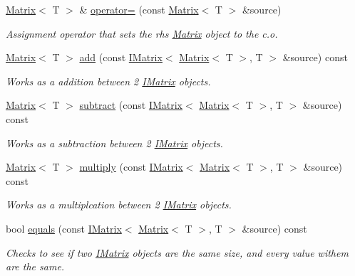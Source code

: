 \begin{DoxyCompactItemize}
\mbox{\hyperlink{class_matrix}{Matrix}}$<$ T $>$ \& \mbox{\hyperlink{class_matrix_a33c00fb6f2e9401d17d9ed615b965634}{operator=}} (const \mbox{\hyperlink{class_matrix}{Matrix}}$<$ T $>$ \&source)
\begin{DoxyCompactList}\small\item\em Assignment operator that sets the rhs \mbox{\hyperlink{class_matrix}{Matrix}} object to the c.\+o. \end{DoxyCompactList}\item 
\mbox{\hyperlink{class_matrix}{Matrix}}$<$ T $>$ \mbox{\hyperlink{class_matrix_a19ee57616bae9c683f2c9e6756cba29e}{add}} (const \mbox{\hyperlink{class_i_matrix}{I\+Matrix}}$<$ \mbox{\hyperlink{class_matrix}{Matrix}}$<$ T $>$, T $>$ \&source) const
\begin{DoxyCompactList}\small\item\em Works as a addition between 2 \mbox{\hyperlink{class_i_matrix}{I\+Matrix}} objects. \end{DoxyCompactList}\item 
\mbox{\hyperlink{class_matrix}{Matrix}}$<$ T $>$ \mbox{\hyperlink{class_matrix_a468aedc8546d97964f692a30f1e24f94}{subtract}} (const \mbox{\hyperlink{class_i_matrix}{I\+Matrix}}$<$ \mbox{\hyperlink{class_matrix}{Matrix}}$<$ T $>$, T $>$ \&source) const
\begin{DoxyCompactList}\small\item\em Works as a subtraction between 2 \mbox{\hyperlink{class_i_matrix}{I\+Matrix}} objects. \end{DoxyCompactList}\item 
\mbox{\hyperlink{class_matrix}{Matrix}}$<$ T $>$ \mbox{\hyperlink{class_matrix_a48fc463a410f5d2b0381830d78229c2c}{multiply}} (const \mbox{\hyperlink{class_i_matrix}{I\+Matrix}}$<$ \mbox{\hyperlink{class_matrix}{Matrix}}$<$ T $>$, T $>$ \&source) const
\begin{DoxyCompactList}\small\item\em Works as a multiplcation between 2 \mbox{\hyperlink{class_i_matrix}{I\+Matrix}} objects. \end{DoxyCompactList}\item 
bool \mbox{\hyperlink{class_matrix_a7bdfaca00fd65171656fd45bdaa6b2a0}{equals}} (const \mbox{\hyperlink{class_i_matrix}{I\+Matrix}}$<$ \mbox{\hyperlink{class_matrix}{Matrix}}$<$ T $>$, T $>$ \&source) const
\begin{DoxyCompactList}\small\item\em Checks to see if two \mbox{\hyperlink{class_i_matrix}{I\+Matrix}} objects are the same size, and every value withem are the same. \end{DoxyCompactList}\item 

\end{DoxyCompactItemize}
